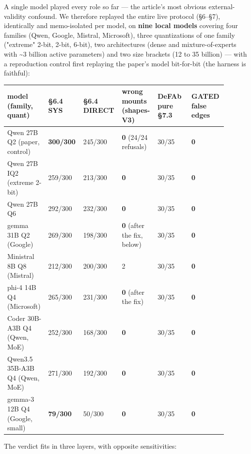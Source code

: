 \documentclass[11pt]{article}
\begin{document}
A single model played every role so far — the article's most obvious external-validity confound. We therefore replayed the entire live protocol (§6–§7), identically and memo-isolated per model, on \textbf{nine local models} covering four families (Qwen, Google, Mistral, Microsoft), three quantizations of one family ("extreme" 2-bit, 2-bit, 6-bit), two architectures (dense and mixture-of-experts with \textasciitilde{}3 billion active parameters) and two size brackets (12 to 35 billion) — with a reproduction control first replaying the paper's model bit-for-bit (the harness is faithful):

\begin{center}\small\begin{tabular}{p{0.15\linewidth}p{0.15\linewidth}p{0.15\linewidth}p{0.15\linewidth}p{0.15\linewidth}p{0.15\linewidth}}\toprule
model (family, quant) & §6.4 SYS & §6.4 DIRECT & wrong mounts (shapes-V3) & DeFAb pure §7.3 & GATED false edges \\ \midrule
Qwen 27B Q2 (paper, control) & \textbf{300/300} & 245/300 & \textbf{0} (24/24 refusals) & 30/35 & \textbf{0} \\
Qwen 27B IQ2 (extreme 2-bit) & 259/300 & 213/300 & \textbf{0} & 30/35 & \textbf{0} \\
Qwen 27B Q6 & 292/300 & 232/300 & \textbf{0} & 30/35 & \textbf{0} \\
gemma 31B Q2 (Google) & 269/300 & 198/300 & \textbf{0} (after the fix, below) & 30/35 & \textbf{0} \\
Ministral 8B Q8 (Mistral) & 212/300 & 200/300 & 2 & 30/35 & \textbf{0} \\
phi-4 14B Q4 (Microsoft) & 265/300 & 231/300 & \textbf{0} (after the fix) & 30/35 & \textbf{0} \\
Coder 30B-A3B Q4 (Qwen, MoE) & 252/300 & 168/300 & \textbf{0} & 30/35 & \textbf{0} \\
Qwen3.5 35B-A3B Q4 (Qwen, MoE) & 271/300 & 192/300 & \textbf{0} & 30/35 & \textbf{0} \\
gemma-3 12B Q4 (Google, small) & \textbf{79/300} & 50/300 & \textbf{0} & 30/35 & \textbf{0} \\
\bottomrule\end{tabular}\end{center}

The verdict fits in three layers, with opposite sensitivities:
\end{document}
